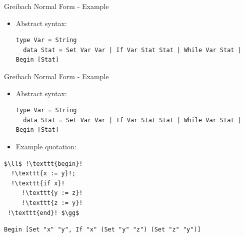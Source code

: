 \documentclass[10pt]{beamer}
\begin{document}
\begin{frame}[fragile]{Greibach Normal Form - Example}

\begin{itemize}

\begin{lstlisting}[mathescape=true, escapechar=!]
  S $\rightarrow$ !\texttt{id}! C E
    | !\texttt{if}! E S S
    | !\texttt{while}! E S
    | !\texttt{begin}! S R
  C $\rightarrow$ !\texttt{:=}!
  E $\rightarrow$ !\texttt{id}!
  R $\rightarrow$ !\texttt{end}! | ; S R
\end{lstlisting}

\item Abstract syntax:
\begin{lstlisting}[mathescape=true, escapechar=!]
  type Var = String
  data Stat = Set Var Var | If Var Stat Stat | While Var Stat | Begin [Stat]
\end{lstlisting}

\end{itemize}

\end{frame}

\begin{frame}[fragile]{Greibach Normal Form - Example}

\begin{itemize}

\item Abstract syntax:
\begin{lstlisting}[mathescape=true, escapechar=!]
  type Var = String
  data Stat = Set Var Var | If Var Stat Stat | While Var Stat | Begin [Stat]
\end{lstlisting}

\item Example quotation:
\end{itemize}

\begin{minipage}[t]{0.3\textwidth}
\begin{lstlisting}[mathescape=true, escapechar=!]
$\ll$ !\texttt{begin}!
  !\texttt{x := y}!;
  !\texttt{if x}!
     !\texttt{y := z}!
     !\texttt{z := y}!
 !\texttt{end}! $\gg$
\end{lstlisting}
\end{minipage}
\hfill
\begin{minipage}[t]{0.6\textwidth}
\begin{lstlisting}[mathescape=true, escapechar=!]
Begin [Set "x" "y", If "x" (Set "y" "z") (Set "z" "y")]
\end{lstlisting}
\end{minipage}

\end{frame}
\end{document}

